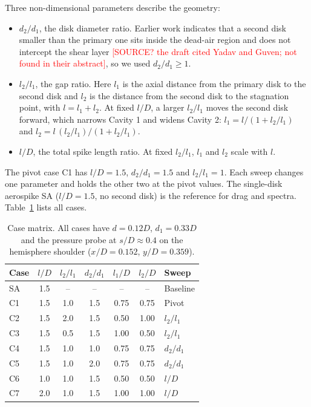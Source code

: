 \documentclass[11pt,a4paper]{article}
\newcommand{\chk}[1]{\textcolor{red}{[#1]}}
\newcommand{\ltl}{l_2/l_1}
\newcommand{\dtd}{d_2/d_1}
\begin{document}
Three non-dimensional parameters describe the geometry:
\begin{itemize}
  \item $\dtd$, the disk diameter ratio. Earlier work indicates that a second disk smaller than the primary one sits inside the dead-air region and does not intercept the shear layer \chk{SOURCE? the draft cited Yadav and Guven; not found in their abstract}, so we used $\dtd \ge 1$.
  \item $\ltl$, the gap ratio. Here $l_1$ is the axial distance from the primary disk to the second disk and $l_2$ is the distance from the second disk to the stagnation point, with $l = l_1 + l_2$. At fixed $l/D$, a larger $\ltl$ moves the second disk forward, which narrows Cavity 1 and widens Cavity 2: $l_1 = l/(1 + \ltl)$ and $l_2 = l\,(\ltl)/(1 + \ltl)$.
  \item $l/D$, the total spike length ratio. At fixed $\ltl$, $l_1$ and $l_2$ scale with $l$.
\end{itemize}

The pivot case C1 has $l/D = 1.5$, $\dtd = 1.5$ and $\ltl = 1$. Each sweep changes one parameter and holds the other two at the pivot values. The single-disk aerospike SA ($l/D = 1.5$, no second disk) is the reference for drag and spectra. Table~\ref{tab:cases} lists all cases.

\begin{table}[htbp]
  \centering
  \caption{Case matrix. All cases have $d = 0.12D$, $d_1 = 0.33D$ and the pressure probe at $s/D \approx 0.4$ on the hemisphere shoulder ($x/D = 0.152$, $y/D = 0.359$).}
  \label{tab:cases}
  \begin{tabular}{lcccccl}
    \toprule
    Case & $l/D$ & $\ltl$ & $\dtd$ & $l_1/D$ & $l_2/D$ & Sweep \\
    \midrule
    SA & 1.5 & -- & -- & -- & -- & Baseline \\
    C1 & 1.5 & 1.0 & 1.5 & 0.75 & 0.75 & Pivot \\
    C2 & 1.5 & 2.0 & 1.5 & 0.50 & 1.00 & $\ltl$ \\
    C3 & 1.5 & 0.5 & 1.5 & 1.00 & 0.50 & $\ltl$ \\
    C4 & 1.5 & 1.0 & 1.0 & 0.75 & 0.75 & $\dtd$ \\
    C5 & 1.5 & 1.0 & 2.0 & 0.75 & 0.75 & $\dtd$ \\
    C6 & 1.0 & 1.0 & 1.5 & 0.50 & 0.50 & $l/D$ \\
    C7 & 2.0 & 1.0 & 1.5 & 1.00 & 1.00 & $l/D$ \\
    \bottomrule
  \end{tabular}
\end{table}
\end{document}

